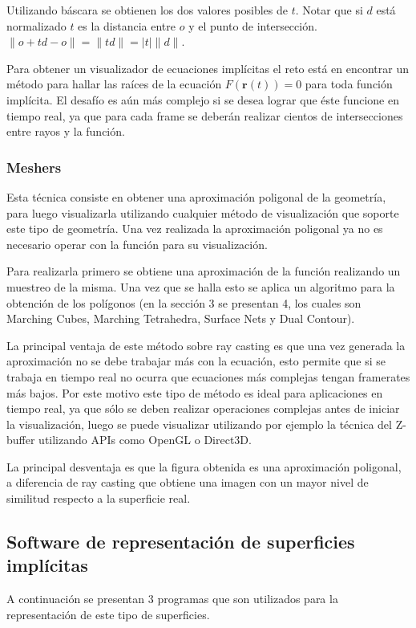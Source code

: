 \documentclass[12pt]{article}
\begin{document}
Utilizando báscara se obtienen los dos valores posibles de $t$. Notar que si $d$ está normalizado $t$ es la distancia entre $o$ y el punto de intersección. $\lVert o + td - o \rVert = \lVert td\rVert = |t|\lVert d \rVert$.

Para obtener un visualizador de ecuaciones implícitas el reto está en encontrar un método para hallar las raíces de la ecuación $F(\textbf{r}(t))=0$ para toda función implícita. El desafío es aún más complejo si se desea lograr que éste funcione en tiempo real, ya que para cada frame se deberán realizar cientos de intersecciones entre rayos y la función.  
\subsubsection{Meshers}
\noindent Esta técnica consiste en obtener una aproximación poligonal de la geometría, para luego visualizarla utilizando cualquier método de visualización que soporte este tipo de geometría. Una vez realizada la aproximación poligonal ya no es necesario operar con la función para su visualización.

Para realizarla primero se obtiene una aproximación de la función realizando un muestreo de la misma. Una vez que se halla esto se aplica un algoritmo para la obtención de los polígonos (en la sección 3 se presentan 4, los cuales son Marching Cubes, Marching Tetrahedra, Surface Nets y Dual Contour)\cite{mykola1}\cite{mykola2}.

La principal ventaja de este método sobre ray casting es que una vez generada la aproximación no se debe trabajar más con la ecuación, esto permite que si se trabaja en tiempo real no ocurra que ecuaciones más complejas tengan framerates más bajos. Por este motivo este tipo de método es ideal para aplicaciones en tiempo real, ya que sólo se deben realizar operaciones complejas antes de iniciar la visualización, luego se puede visualizar utilizando por ejemplo la técnica del Z-buffer utilizando APIs como OpenGL o Direct3D.

La principal desventaja es que la figura obtenida es una aproximación poligonal, a diferencia de ray casting que obtiene una imagen con un mayor nivel de similitud respecto a la superficie real\cite{realtimerendering}.

\subsection{Software de representación de superficies implícitas}
\noindent A continuación se presentan 3 programas que son utilizados para la representación de este tipo de superficies.
\end{document}
